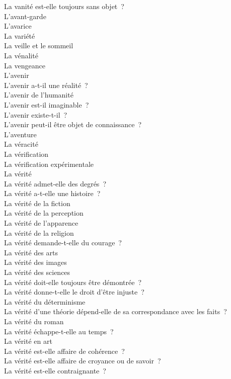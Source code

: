 \documentclass[a4paper,12pt]{article}
\begin{document}
La vanité est-elle toujours sans objet ? \\
L'avant-garde \\
L'avarice \\
La variété \\
La veille et le sommeil \\
La vénalité \\
La vengeance \\
L'avenir \\
L'avenir a-t-il une réalité ? \\
L'avenir de l'humanité \\
L'avenir est-il imaginable ? \\
L'avenir existe-t-il ? \\
L'avenir peut-il être objet de connaissance ? \\
L'aventure \\
La véracité \\
La vérification \\
La vérification expérimentale \\
La vérité \\
La vérité admet-elle des degrés ? \\
La vérité a-t-elle une histoire ? \\
La vérité de la fiction \\
La vérité de la perception \\
La vérité de l'apparence \\
La vérité de la religion \\
La vérité demande-t-elle du courage ? \\
La vérité des arts \\
La vérité des images \\
La vérité des sciences \\
La vérité doit-elle toujours être démontrée ? \\
La vérité donne-t-elle le droit d'être injuste ? \\
La vérité du déterminisme \\
La vérité d'une théorie dépend-elle de sa correspondance avec les faits ? \\
La vérité du roman \\
La vérité échappe-t-elle au temps ? \\
La vérité en art \\
La vérité est-elle affaire de cohérence ? \\
La vérité est-elle affaire de croyance ou de savoir ? \\
La vérité est-elle contraignante ? \\
\end{document}
